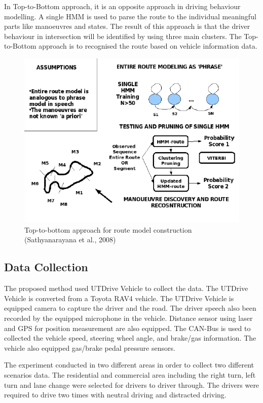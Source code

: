 In Top-to-Bottom approach, it is an opposite approach in driving behaviour modelling. A single HMM is used to parse the route to the individual meaningful parts like manoeuvres and states. The result of this approach is that the driver behaviour in intersection will be identified by using three main clusters. The Top-to-Bottom approach is to recognised the route based on vehicle information data.

\begin{figure}[hbt!]\centering
\includegraphics[width=.75\textwidth]{image/ToptoBottom}
\caption{Top-to-bottom approach for route model construction (Sathyanarayana et al., 2008)}
\end{figure}

\subsection{Data Collection}
The proposed method used UTDrive Vehicle to collect the data. The UTDrive Vehicle is converted from a Toyota RAV4 vehicle. The UTDrive Vehicle is equipped camera to capture the driver and the road. The driver speech also been recorded by the equipped microphone in the vehicle. Distance sensor using laser and GPS for position measurement are also equipped. The CAN-Bus is used to collected the vehicle speed, steering wheel angle, and brake/gas information. The vehicle also equipped gas/brake pedal pressure sensors. 

The experiment conducted in two different areas in order to collect two different scenarios data. The residential and commercial area including the right turn, left turn and lane change were selected for drivers to driver through. The drivers were required to drive two times with neutral driving and distracted driving. 
 
